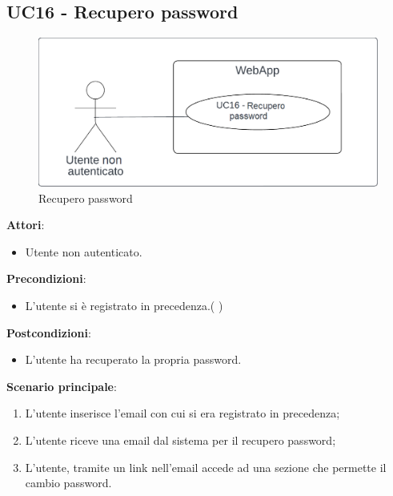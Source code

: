 \subsection{UC16 - Recupero password} \label{usecase:16}
\begin{figure}[H]
    \centering
    \includegraphics[width=0.9\linewidth]{ucd/ucd16.png}
    \caption{Recupero password}
\end{figure}
\textbf{Attori}:
\begin{itemize}
    \item Utente non autenticato.
\end{itemize}
\textbf{Precondizioni}:
\begin{itemize}
    \item L'utente si è registrato in precedenza.( )
\end{itemize}
\textbf{Postcondizioni}:
\begin{itemize}
    \item L'utente ha recuperato la propria password.
\end{itemize}
\textbf{Scenario principale}:
\begin{enumerate}
    \item L'utente inserisce l'email con cui si era registrato in precedenza;
    \item L'utente riceve una email dal sistema per il recupero password;
    \item L'utente, tramite un link nell'email accede ad una sezione che permette il cambio password.
\end{enumerate}
\newpage